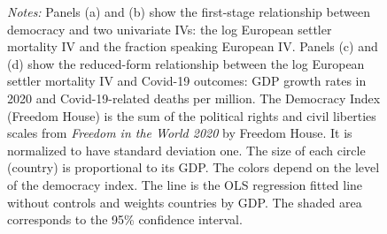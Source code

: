 \begin{figure}[htb]
\caption*{\textit{Notes:} Panels (a) and (b) show the first-stage relationship between democracy and two univariate IVs: the log European settler mortality IV and the fraction speaking European IV. Panels (c) and (d) show the reduced-form relationship between the log European settler mortality IV and Covid-19 outcomes: GDP growth rates in 2020 and Covid-19-related deaths per million. The Democracy Index (Freedom House) is the sum of the political rights and civil liberties scales from \emph{Freedom in the World 2020} by Freedom House. It is normalized to have standard deviation one. The size of each circle (country) is proportional to its GDP. The colors depend on the level of the democracy index. The line is the OLS regression fitted line without controls and weights countries by GDP. The shaded area corresponds to the 95\% confidence interval.}
\end{figure}

